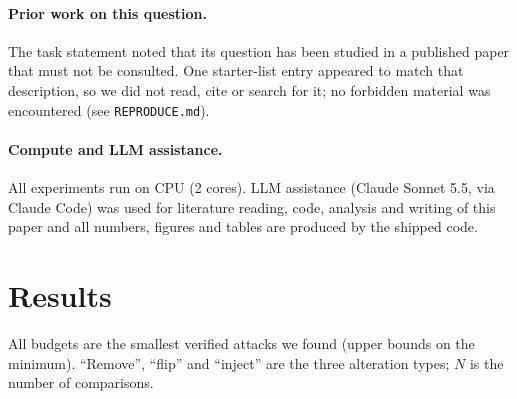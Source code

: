 \documentclass{article}
\begin{document}
\paragraph{Prior work on this question.} The task statement noted that its question has been studied in a published paper that must not be consulted. One starter-list entry appeared to match that description, so we did not read, cite or search for it; no forbidden material was encountered (see \texttt{REPRODUCE.md}).
\paragraph{Compute and LLM assistance.}
All experiments run on CPU (2 cores). LLM assistance (Claude Sonnet 5.5, via Claude Code) was used for literature reading, code, analysis and writing of this paper and all numbers, figures and tables are produced by the shipped code.

\section{Results}\label{sec:results}
All budgets are the smallest verified attacks we found (upper bounds on the minimum). ``Remove'', ``flip'' and ``inject'' are the three alteration types; $N$ is the number of comparisons.
\end{document}
